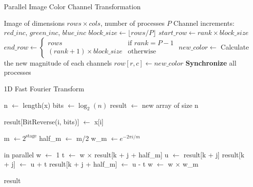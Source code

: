 \documentclass{article}
\begin{document}
\begin{algorithm}
\caption{Parallel Image Color Channel Transformation}
\begin{algorithmic}[1]
\Require Image of dimensions $rows \times cols$, number of processes $P$
\Require Channel increments: $red\_inc$, $green\_inc$, $blue\_inc$
\State $block\_size \gets \lfloor rows/P \rfloor$
\State $start\_row \gets rank \times block\_size$
\State $end\_row \gets \begin{cases} 
rows & \text{if } rank = P-1 \\
(rank + 1) \times block\_size & \text{otherwise}
\end{cases}$
        \State $new\_color \gets$ Calculate the new magnitude of each channels
        \State $row[r, c] \gets new\_color$
    \EndFor
\EndFor
\State \textbf{Synchronize} all processes
\end{algorithmic}
\end{algorithm}

\begin{algorithm}
\caption{1D Fast Fourier Transform}
\begin{algorithmic}[1]
    \State n $\gets$ length(x)
    \State bits $\gets \log_2(n)$
    \State result $\gets$ new array of size n
    
        \State result[BitReverse(i, bits)] $\gets$ x[i]
    \EndFor
    
        \State m $\gets 2^{\text{stage}}$
        \State half\_m $\gets$ m/2
        \State w\_m $\gets e^{-2\pi i/m}$
        
         in parallel
            \State w $\gets$ 1
                \State t $\gets$ w $\times$ result[k + j + half\_m]
                \State u $\gets$ result[k + j]
                \State result[k + j] $\gets$ u + t
                \State result[k + j + half\_m] $\gets$ u - t
                \State w $\gets$ w $\times$ w\_m
            \EndFor
        \EndFor
    \EndFor
    
    \Return result
\EndProcedure
\end{algorithmic}
\end{algorithm}
\end{document}
